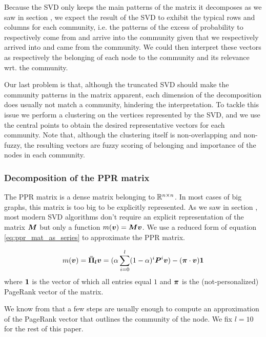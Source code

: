 Because the SVD only keeps the main patterns of the matrix it decomposes as we saw in section , we expect the result of the SVD to exhibit the typical rows and columns for each community, i.e. the patterns of the excess of probability to respectively come from and arrive into the community given that we respectively arrived into and came from the community.
We could then interpret these vectors as respectively the belonging of each node to the community and its relevance wrt. the community.

Our last problem is that, although the truncated SVD should make the community patterns in the matrix apparent, each dimension of the decomposition does usually not match a community, hindering the interpretation. To tackle this issue we perform a clustering on the vertices represented by the SVD, and we use the central points to obtain the desired representative vectors for each community. Note that, although the clustering itself is non-overlapping and non-fuzzy, the resulting vectors are fuzzy scoring of belonging and importance of the nodes in each community.

\subsubsection{Decomposition of the PPR matrix}
The PPR matrix is a dense matrix belonging to $\mathbb{R}^{n\times n}$. In most cases of big graphs, this matrix is too big to be explicitly represented. As we saw in section , most modern SVD algorithms don't require an explicit representation of the matrix $\boldsymbol{M}$ but only a function $m(\boldsymbol{v}) = \boldsymbol{M}\boldsymbol{v}$. We use a reduced form of equation \eqref{eq:ppr_mat_as_series} to approximate the PPR matrix.

\begin{equation}
    m(\boldsymbol{v}) = \boldsymbol{\Bar{\Pi}_l}\boldsymbol{v} = (\alpha \sum_{i=0}^l (1-\alpha)^i\boldsymbol{P}^i\boldsymbol{v}) - (\boldsymbol{\pi} \cdot \boldsymbol{v}) \boldsymbol{1}
\end{equation}
\noindent where $\boldsymbol{1}$ is the vector of which all entries equal $1$ and $\boldsymbol{\pi}$ is the (not-personalized) PageRank vector of the matrix.

We know from \cite{Kloumann2014} that a few steps are usually enough to compute an approximation of the PageRank vector that outlines the community of the node. We fix $l=10$ for the rest of this paper.

